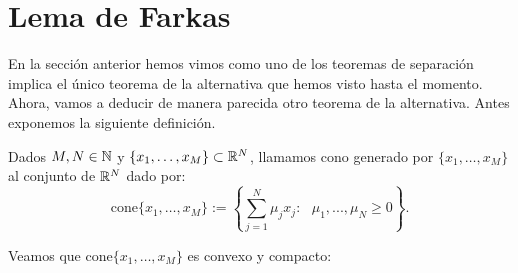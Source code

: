 \chapter{Lema de Farkas}

En la sección anterior hemos vimos como uno de los teoremas de separación implica el único teorema de la alternativa que hemos visto hasta el momento. Ahora, vamos a deducir de manera parecida otro teorema de la alternativa. Antes exponemos la siguiente definición.

\begin{definicion}
	Dados $ M, N \in \mathbb{N} $ y $ \{x_1,\dots, x_M \} \subset \mathbb{R}^N  $, llamamos cono generado por $ \{x_1,\dots, x_M \} $ al conjunto de $ \mathbb{R}^N $ dado por:
	\begin{equation*}
	\mathrm{cone}\{x_1,\dots, x_M \} := \left\lbrace \sum_{j=1}^{N}{\mu_j x_j } : \text{ } \mu_1,...,\mu_N \geq 0 \right\rbrace .
	\end{equation*}
\end{definicion}

Veamos que $ \mathrm{cone}\{x_1,\dots, x_M \} $ es convexo y compacto:


